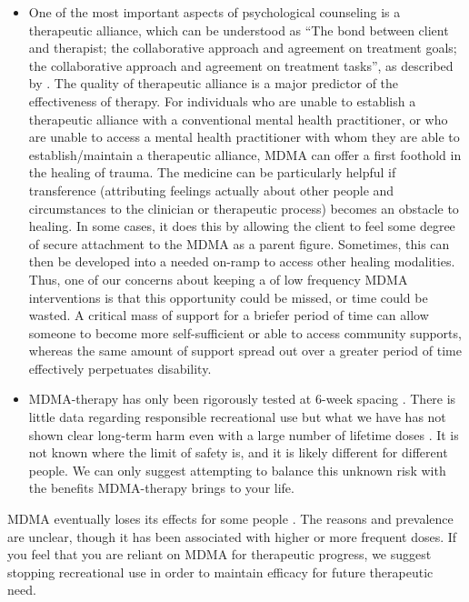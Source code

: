 \documentclass[12pt,letterpaper]{article}
\begin{document}
\begin{itemize}
    \item One of the most important aspects of psychological counseling is a therapeutic alliance, which can be understood as “The bond between client and therapist; the collaborative approach and agreement on treatment goals; the collaborative approach and agreement on treatment tasks”, as described by \textcite{BRWAIdownload}. The quality of therapeutic alliance is a major predictor of the effectiveness of therapy. For individuals who are unable to establish a therapeutic alliance with a conventional mental health practitioner, or who are unable to access a mental health practitioner with whom they are able to establish/maintain a therapeutic alliance, MDMA can offer a first foothold in the healing of trauma. The medicine can be particularly helpful if transference (attributing feelings actually about other people and circumstances to the clinician or therapeutic process) becomes an obstacle to healing. In some cases, it does this by allowing the client to feel some degree of secure attachment to the MDMA as a parent figure. Sometimes, this can then be developed into a needed on-ramp to access other healing modalities. Thus, one of our concerns about keeping a of low frequency MDMA interventions is that this opportunity could be missed, or time could be wasted. A critical mass of support for a briefer period of time can allow someone to become more self-sufficient or able to access community supports, whereas the same amount of support spread out over a greater period of time effectively perpetuates disability.
    \item MDMA-therapy has only been rigorously tested at 6-week spacing \cite{mitchellMDMAClinicalTrial2}. There is little data regarding responsible recreational use but what we have has not shown clear long-term harm even with a large number of lifetime doses \cite{halpernMormonRavers}.  It is not known where the limit of safety is, and it is likely different for different people. We can only suggest attempting to balance this unknown risk with the benefits MDMA-therapy brings to your life.
\end{itemize}

MDMA eventually loses its effects for some people \cite{farreTolerance,parrottTolerance}. The reasons and prevalence are unclear, though it has been associated with higher or more frequent doses. If you feel that you are reliant on MDMA for therapeutic progress, we suggest stopping recreational use in order to maintain efficacy for future therapeutic need.
\end{document}
